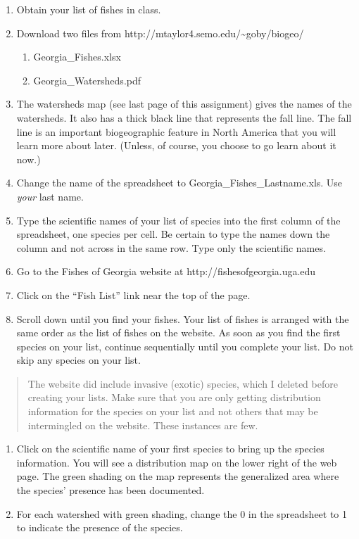 \documentclass[12pt]{exam}
\begin{document}
\begin{enumerate}
\item
  Obtain your list of fishes in class.
\item
  Download two files from
  http://mtaylor4.semo.edu/\textasciitilde{}goby/biogeo/

  \begin{enumerate}
  \def\labelenumii{\arabic{enumii}.}
  \item
    Georgia\_Fishes.xlsx
  \item
    Georgia\_Watersheds.pdf
  \end{enumerate}
\item
  The watersheds map (see last page of this assignment) gives 
  the names of the watersheds. It also has a thick black line 
  that represents the fall line. The fall line is an important 
  biogeographic feature in North America that you will learn 
  more about later. (Unless, of course, you choose to go learn 
  about it now.)
\item
  Change the name of the spreadsheet to Georgia\_Fishes\_Lastname.xls.
  Use \emph{your} last name.
\item
  Type the scientific names of your list of species into the first
  column of the spreadsheet, one species per cell. Be certain to 
  type the names down the column and not across in the same row. 
  Type only the scientific names.
\item
  Go to the Fishes of Georgia website at http://fishesofgeorgia.uga.edu
\item
  Click on the ``Fish List'' link near the top of the page.
\item
  Scroll down until you find your fishes. Your list of fishes is
  arranged with the same order as the list of fishes on the 
  website. As soon as you find the first species on your list, 
  continue sequentially until you complete your list. Do not skip 
  any species on your list.
\end{enumerate}

\begin{quote}
The website did include invasive (exotic) species, which I deleted
before creating your lists. Make sure that you are only getting
distribution information for the species on your list and not 
others that may be intermingled on the website. These instances 
are few.
\end{quote}

\begin{enumerate}[resume]
\item
  Click on the scientific name of your first species to bring up 
  the species information. You will see a distribution map on the 
  lower right of the web page. The green shading on the map 
  represents the generalized area where the species' presence has 
  been documented.
\item
  For each watershed with green shading, change the 0 in the 
  spreadsheet to 1 to indicate the presence of the species.
\end{enumerate}
\end{document}
